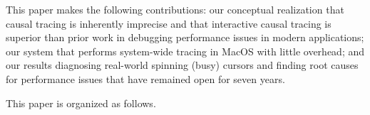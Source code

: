 This paper makes the following contributions: our conceptual realization
that causal tracing is inherently imprecise and that interactive causal
tracing is superior than prior work in debugging performance issues in
modern applications; our system \xxx that performs system-wide tracing in
MacOS with little overhead; and our results diagnosing real-world spinning (busy)
cursors and finding root causes for performance issues that have remained open
for seven years.

This paper is organized as follows.




